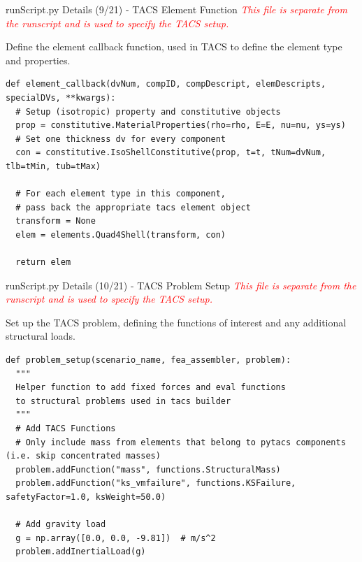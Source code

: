 \documentclass{bredelebeamer}
\begin{document}
\begin{frame}[fragile]{runScript.py Details (9/21) - \large TACS Element Function}
\textcolor{red}{\textit{This file is separate from the runscript and is used to specify the TACS setup.}}

\vspace{0.25cm}

Define the element callback function, used in TACS to define the element type and properties.
\scriptsize
\lstset{ language=bash }
\begin{lstlisting}
def element_callback(dvNum, compID, compDescript, elemDescripts, specialDVs, **kwargs):
  # Setup (isotropic) property and constitutive objects
  prop = constitutive.MaterialProperties(rho=rho, E=E, nu=nu, ys=ys)
  # Set one thickness dv for every component
  con = constitutive.IsoShellConstitutive(prop, t=t, tNum=dvNum, tlb=tMin, tub=tMax)

  # For each element type in this component,
  # pass back the appropriate tacs element object
  transform = None
  elem = elements.Quad4Shell(transform, con)

  return elem
\end{lstlisting}
\normalsize
\end{frame}

\begin{frame}[fragile]{runScript.py Details (10/21) - \large TACS Problem Setup}
\textcolor{red}{\textit{This file is separate from the runscript and is used to specify the TACS setup.}}

\vspace{0.25cm}

Set up the TACS problem, defining the functions of interest and any additional structural loads.

\scriptsize
\lstset{ language=bash }
\begin{lstlisting}
def problem_setup(scenario_name, fea_assembler, problem):
  """
  Helper function to add fixed forces and eval functions
  to structural problems used in tacs builder
  """
  # Add TACS Functions
  # Only include mass from elements that belong to pytacs components (i.e. skip concentrated masses)
  problem.addFunction("mass", functions.StructuralMass)
  problem.addFunction("ks_vmfailure", functions.KSFailure, safetyFactor=1.0, ksWeight=50.0)

  # Add gravity load
  g = np.array([0.0, 0.0, -9.81])  # m/s^2
  problem.addInertialLoad(g)
\end{lstlisting}
\normalsize
\end{frame}
\end{document}
